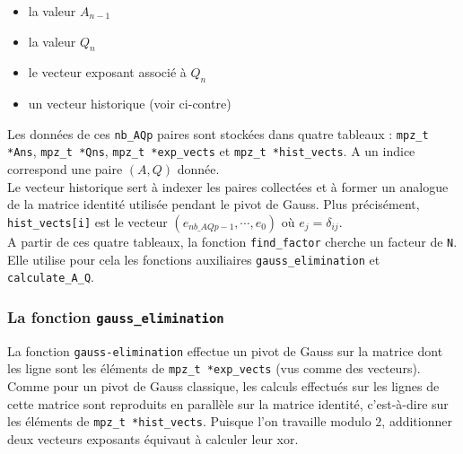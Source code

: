\begin{itemize}
    \item la valeur $A_{n-1}$
    \item la valeur $Q_n$
    \item le vecteur exposant associé à $Q_n$
    \item un vecteur historique (voir ci-contre) \end{itemize}

Les données de ces \texttt{nb\_AQp} paires sont stockées dans
quatre tableaux : \texttt{mpz\_t *Ans}, \texttt{mpz\_t *Qns}, 
\texttt{mpz\_t *exp\_vects} et \texttt{mpz\_t *hist\_vects}.
A un indice correspond une paire $(A,Q)$ donnée. \\

Le vecteur historique sert à indexer les paires collectées et à former
un analogue de la matrice identité utilisée pendant le pivot de Gauss. 
Plus précisément, \texttt{hist\_vects[i]} est le vecteur $(e_{nb\_AQp -1 }, 
\cdots, e_0)$ où $e_j = \delta_{ij}$.\\ 

A partir de ces quatre tableaux, la fonction \texttt{find\_factor} cherche 
un facteur de \texttt{N}. Elle utilise pour cela les fonctions auxiliaires 
\texttt{gauss\_elimination} et \texttt{calculate\_A\_Q}. 

\subsubsection{La fonction \texttt{gauss\_elimination}}

La fonction \texttt{gauss-elimination} effectue un pivot de Gauss sur la
matrice dont les ligne sont les éléments de \texttt{mpz\_t *exp\_vects} 
(vus comme des vecteurs). Comme pour un pivot de Gauss classique, les 
calculs effectués sur les lignes de cette matrice sont reproduits en 
parallèle sur la matrice identité, c'est-à-dire sur les éléments de 
\texttt{mpz\_t *hist\_vects}. Puisque l'on travaille modulo $2$, additionner
deux vecteurs exposants équivaut à calculer leur xor. 

